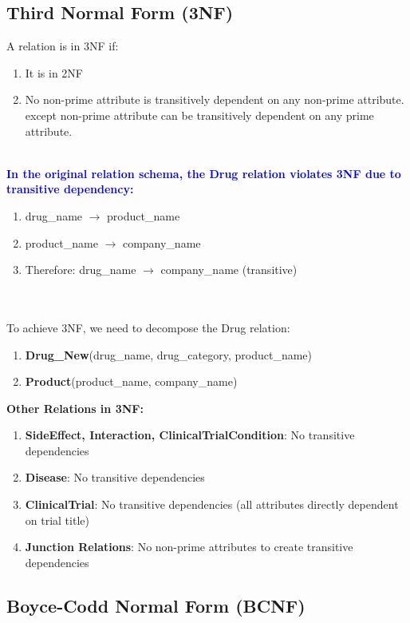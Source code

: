 \documentclass[12pt,a4paper]{article}
\begin{document}
\subsection{Third Normal Form (3NF)}

A relation is in 3NF if:
\begin{enumerate}
    \item It is in 2NF
    \item No non-prime attribute is transitively dependent on any non-prime attribute.
    except non-prime attribute can be transitively dependent on any prime attribute.
\end{enumerate}\\


\textcolor{blue}{\textbf{In the original relation schema, the Drug relation violates 3NF due to transitive dependency:}}
\begin{enumerate}
    \item drug\_name $\rightarrow$ product\_name
    \item product\_name $\rightarrow$ company\_name
    \item Therefore: drug\_name $\rightarrow$ company\_name (transitive)
\end{enumerate}\\ \\


To achieve 3NF, we need to decompose the Drug relation:

\begin{enumerate}
    \item \textbf{Drug\_New}(drug\_name, drug\_category, product\_name)
    \item \textbf{Product}(product\_name, company\_name)
\end{enumerate}

\textbf{Other Relations in 3NF:}
\begin{enumerate}
    \item \textbf{SideEffect, Interaction, ClinicalTrialCondition}: No transitive dependencies
    \item \textbf{Disease}: No transitive dependencies
    \item \textbf{ClinicalTrial}: No transitive dependencies (all attributes directly dependent on trial title)
    \item \textbf{Junction Relations}: No non-prime attributes to create transitive dependencies
\end{enumerate}

\subsection{Boyce-Codd Normal Form (BCNF)}
\end{document}
